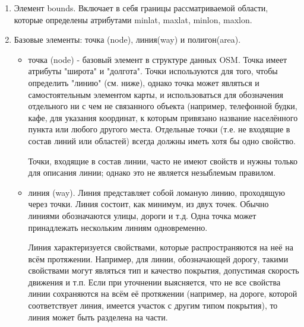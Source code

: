 \documentclass[12pt,a4paper,oneside]{article} %
\begin{document}
\begin{enumerate}
\item Элемент bounds. Включает в себя границы рассматриваемой области, \linebreak
которые определены атрибутами minlat, maxlat, minlon, maxlon.
\item Базовые элементы: точка (node), линия(way) и полигон(area).
\begin{itemize}
\item точка (node) - базовый элемент в структуре данных OSM. Точка \linebreak
имеет атрибуты "широта" и "долгота". Точки используются для того, \linebreak
чтобы определить "линию" (см. ниже), однако точка может являться и \linebreak
самостоятельным элементом карты, и использоваться для обозначения \linebreak
отдельного ни с чем не связанного объекта (например, телефонной \linebreak
будки, кафе, для указания координат, к которым привязано название \linebreak
населённого пункта или любого другого места. Отдельные точки \linebreak
(т.е. не входящие в состав линий или областей) всегда должны иметь \linebreak
хотя бы одно свойство.

Точки, входящие в состав линии, часто не имеют свойств и нужны \linebreak
только для описания линии; однако это не является незыблемым правилом.


\item линия (way). Линия представляет собой ломаную линию, \linebreak
проходящую через точки. Линия состоит, как минимум, из двух \linebreak
точек. Обычно линиями обозначаются улицы, дороги и т.д. Одна \linebreak
точка может принадлежать нескольким линиям одновременно.

Линия характеризуется свойствами, которые распространяются на \linebreak
неё на всём протяжении. Например, для линии, обозначающей \linebreak
дорогу, такими свойствами могут являться тип и качество покрытия, \linebreak
допустимая скорость движения и т.п. Если при уточнении \linebreak
выясняется, что не все свойства линии сохраняются на всём её \linebreak
протяжении (например, на дороге, которой соответствует линия, \linebreak
имеется участок с другим типом покрытия), то линия может быть \linebreak
разделена на части.


\end{itemize}
\end{enumerate}
\end{document}
